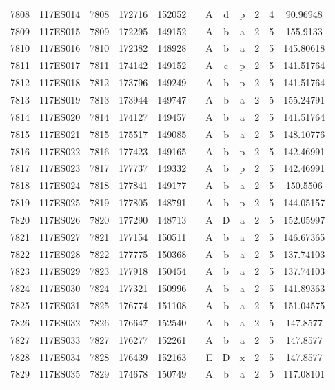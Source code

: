 \begin{tabular}{|*{12}{c|}}
7808 & 117ES014 & 7808 & 172716 & 152052 &  & A & d & p & 2 & 4 & 90.96948 \\ 
7809 & 117ES015 & 7809 & 172295 & 149152 &  & A & b & a & 2 & 5 & 155.9133 \\ 
7810 & 117ES016 & 7810 & 172382 & 148928 &  & A & b & a & 2 & 5 & 145.80618 \\ 
7811 & 117ES017 & 7811 & 174142 & 149152 &  & A & c & p & 2 & 5 & 141.51764 \\ 
7812 & 117ES018 & 7812 & 173796 & 149249 &  & A & b & p & 2 & 5 & 141.51764 \\ 
7813 & 117ES019 & 7813 & 173944 & 149747 &  & A & b & a & 2 & 5 & 155.24791 \\ 
7814 & 117ES020 & 7814 & 174127 & 149457 &  & A & b & a & 2 & 5 & 141.51764 \\ 
7815 & 117ES021 & 7815 & 175517 & 149085 &  & A & b & a & 2 & 5 & 148.10776 \\ 
7816 & 117ES022 & 7816 & 177423 & 149165 &  & A & b & p & 2 & 5 & 142.46991 \\ 
7817 & 117ES023 & 7817 & 177737 & 149332 &  & A & b & p & 2 & 5 & 142.46991 \\ 
7818 & 117ES024 & 7818 & 177841 & 149177 &  & A & b & a & 2 & 5 & 150.5506 \\ 
7819 & 117ES025 & 7819 & 177805 & 148791 &  & A & b & p & 2 & 5 & 144.05157 \\ 
7820 & 117ES026 & 7820 & 177290 & 148713 &  & A & D & a & 2 & 5 & 152.05997 \\ 
7821 & 117ES027 & 7821 & 177154 & 150511 &  & A & b & a & 2 & 5 & 146.67365 \\ 
7822 & 117ES028 & 7822 & 177775 & 150368 &  & A & b & a & 2 & 5 & 137.74103 \\ 
7823 & 117ES029 & 7823 & 177918 & 150454 &  & A & b & a & 2 & 5 & 137.74103 \\ 
7824 & 117ES030 & 7824 & 177321 & 150996 &  & A & b & a & 2 & 5 & 141.89363 \\ 
7825 & 117ES031 & 7825 & 176774 & 151108 &  & A & b & a & 2 & 5 & 151.04575 \\ 
7826 & 117ES032 & 7826 & 176647 & 152540 &  & A & b & a & 2 & 5 & 147.8577 \\ 
7827 & 117ES033 & 7827 & 176277 & 152261 &  & A & b & a & 2 & 5 & 147.8577 \\ 
7828 & 117ES034 & 7828 & 176439 & 152163 &  & E & D & x & 2 & 5 & 147.8577 \\ 
7829 & 117ES035 & 7829 & 174678 & 150749 &  & A & b & a & 2 & 5 & 117.08101 \\ 

\end{tabular}
